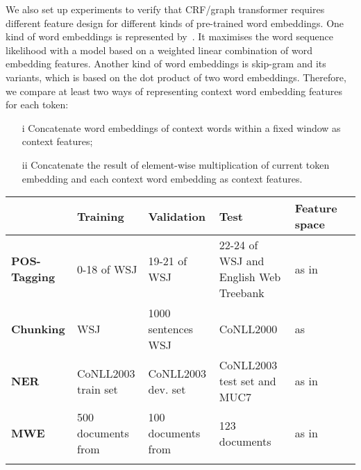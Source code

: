 We also set up experiments to verify that CRF/graph transformer requires different feature design for different kinds of pre-trained word embeddings. One kind of word embeddings is represented by~\cite{bengio2006neural}. It maximises the word sequence likelihood with a model based on a weighted linear combination of word embedding features. Another kind of word embeddings is skip-gram and its variants, which is based on the dot product of two word embeddings. Therefore, we compare at least two ways of representing context word embedding features for each token:

\begin{small}
\begin{itemize}
\item[i] Concatenate word embeddings of context words within a fixed window as context features; 
\item[ii] Concatenate the result of element-wise multiplication of current token embedding and each context word embedding as context features. 
\end{itemize}
\end{small}



\begin{table*}
\begin{small}
\begin{tabular}{lllp{3cm}ll}
\hline
			& \textbf{Training} & \textbf{Validation} & \textbf{Test} & \textbf{Feature space} \\ \hline
\textbf{POS-Tagging} & 0-18 of WSJ & 19-21 of WSJ & 22-24 of WSJ and English Web Treebank & as in~\cite{collobert2011natural} \\
\textbf{Chunking} & WSJ & 1000 sentences WSJ & CoNLL2000 & as~\cite{turian2010word}\\
\textbf{NER} & CoNLL2003 train set & CoNLL2003 dev. set & CoNLL2003 test set and MUC7 & as in~\cite{turian2010word} \\
\textbf{MWE} & 500 documents from & 100 documents from & 123 documents & as in~\cite{mwecorpus}\\
\hline
\label{datasplit}
\end{tabular}
\end{small}
\end{table*}



